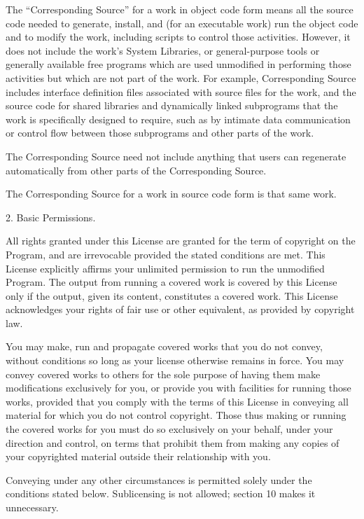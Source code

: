 \documentclass[letterpaper,12pt]{article}
\begin{document}
{The ``Corresponding Source'' for a work in object code form means all the source code needed to generate, install, and (for an executable work) run the object code and to modify the work, including scripts to control those activities. However, it does not include the work's System Libraries, or general-purpose tools or generally available free programs which are used unmodified in performing those activities but which are not part of the work. For example, Corresponding Source includes interface definition files associated with source files for the work, and the source code for shared libraries and dynamically linked subprograms that the work is specifically designed to require, such as by intimate data communication or control flow between those subprograms and other parts of the work.

The Corresponding Source need not include anything that users can regenerate automatically from other parts of the Corresponding Source.

The Corresponding Source for a work in source code form is that same work.

2. Basic Permissions.

All rights granted under this License are granted for the term of copyright on the Program, and are irrevocable provided the stated conditions are met. This License explicitly affirms your unlimited permission to run the unmodified Program. The output from running a covered work is covered by this License only if the output, given its content, constitutes a covered work. This License acknowledges your rights of fair use or other equivalent, as provided by copyright law.

You may make, run and propagate covered works that you do not convey, without conditions so long as your license otherwise remains in force. You may convey covered works to others for the sole purpose of having them make modifications exclusively for you, or provide you with facilities for running those works, provided that you comply with the terms of this License in conveying all material for which you do not control copyright. Those thus making or running the covered works for you must do so exclusively on your behalf, under your direction and control, on terms that prohibit them from making any copies of your copyrighted material outside their relationship with you.

Conveying under any other circumstances is permitted solely under the conditions stated below. Sublicensing is not allowed; section 10 makes it unnecessary.

}
\end{document}
